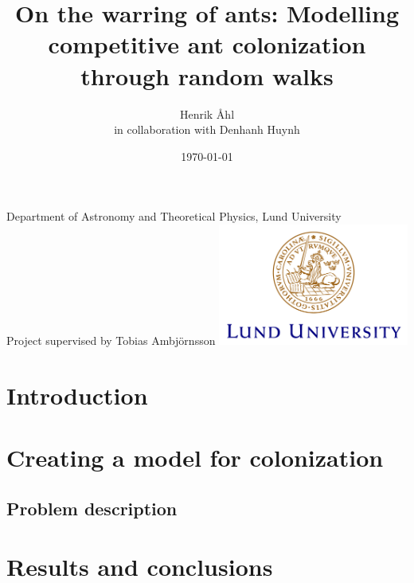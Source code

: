 \documentclass[a4paper,12pt]{article}
\title
{
	\textbf
	{
   On the warring of ants: Modelling competitive ant colonization through random walks
   }
}
\author{Henrik Åhl\\
\small{in collaboration with Denhanh Huynh}}
\date{\today}
\theoremstyle{plain}
\theoremstyle{definition}
\begin{document}
\begin{titlepage}
	
   \maketitle 
	\begin{center}
		\phantom{a}
		{Department of Astronomy and Theoretical Physics, Lund University}
		\\[2cm]
		{Project supervised by Tobias Ambjörnsson}
		\vfill
		\includegraphics[height=4cm]{logocLUeng.pdf}
	\end{center}
	\thispagestyle{empty} %

\end{titlepage}

\section{Introduction}

\newpage

\section{Creating a model for colonization}
	\setcounter{equation}{0}
   \subsection{Problem description}
   

\section{Results and conclusions}
   
\end{document}
